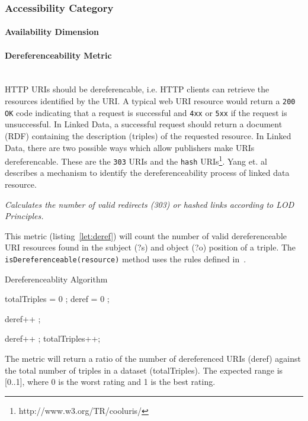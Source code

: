 
\subsubsection{Accessibility Category}
\label{sec:Accessibility} 

\paragraph{Availability Dimension} %

\paragraph{Dereferenceability Metric} ~\\ %
HTTP URIs should be dereferencable, i.e. HTTP clients can retrieve the resources identified by the URI.
A typical web URI resource would return a \texttt{200 OK} code indicating that a request is successful and \texttt{4xx} or \texttt{5xx} if the request is unsuccessful. 
In Linked Data, a successful request should return a document (RDF) containing the description (triples) of the requested resource.
In Linked Data, there are two possible ways which allow publishers make URIs dereferencable.
These are the \texttt{303} URIs and the \texttt{hash} URIs\footnote{http://www.w3.org/TR/cooluris/}.
Yang et. al~\cite{Yang2011} describes a mechanism to identify the dereferenceability process of linked data resource.
\begin{mdframed}[style=metricdefinition]
\emph{Calculates the number of valid redirects (303) or hashed links according to LOD Principles.}
\end{mdframed}

This metric (listing~\ref{let:deref}) will count the number of valid dereferenceable URI resources found in the subject (?s) and object (?o) position of a triple. The \texttt{isDereferenceable(resource)} method uses the rules defined in~\cite{Yang2011}.
\begin{algorithm}
\caption{Dereferenceablity Algorithm}\label{lst:deref}
\begin{algorithmic}[1]
\State totalTriples = 0 ;
\State deref = 0 ;
\EndProcedure

 deref++ ; \EndIf

 deref++ ; \EndIf
\State totalTriples++;
\EndProcedure
\end{algorithmic}
\end{algorithm}
The metric will return a ratio of the number of dereferenced URIs (deref) against the total number of triples in a dataset (totalTriples). The expected range is [0..1], where 0 is the worst rating and 1 is the best rating.


